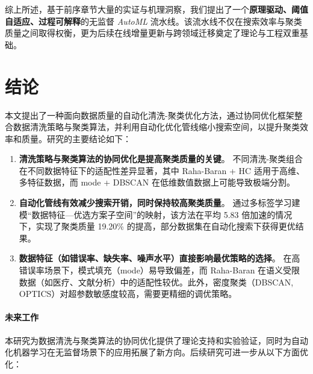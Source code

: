 \documentclass[10pt]{article} %
\numberwithin{equation}{section}
\begin{document}
\vspace{0.5em}
\noindent
\textcolor[rgb]{0.00,0.07,1.00}{综上所述，基于前序章节大量的实证与机理洞察，我们提出了一个\textbf{原理驱动、阈值自适应、过程可解释}的无监督 \textit{AutoML} 流水线。该流水线不仅在搜索效率与聚类质量之间取得权衡，更为后续在线增量更新与跨领域迁移奠定了理论与工程双重基础。}



\section{结论}
\label{sec:conclusion}

本文提出了一种面向数据质量的自动化清洗-聚类优化方法，通过协同优化框架整合数据清洗策略与聚类算法，并利用自动化优化管线缩小搜索空间，以提升聚类效率和质量。研究的主要结论如下：

\begin{enumerate}
    \item \textbf{清洗策略与聚类算法的协同优化是提高聚类质量的关键}。  
    不同清洗-聚类组合在不同数据特征下的适配性差异显著，其中 Raha-Baran + HC 适用于高维、多特征数据，而 mode + DBSCAN 在低维数值数据上可能导致极端分割。

    \item \textbf{自动化管线有效减少搜索开销，同时保持较高聚类质量}。  
    通过多标签学习建模“数据特征—优选方案子空间”的映射，该方法在平均 5.83 倍加速的情况下，实现了聚类质量 19.20\% 的提高，部分数据集在自动化搜索下获得更优结果。

    \item \textbf{数据特征（如错误率、缺失率、噪声水平）直接影响最优策略的选择}。  
    在高错误率场景下，模式填充（mode）易导致偏差，而 Raha-Baran 在语义受限数据（如医疗、文献分析）中的适配性较优。此外，密度聚类（DBSCAN, OPTICS）对超参数敏感度较高，需要更精细的调优策略。
\end{enumerate}

\paragraph{未来工作}  
本研究为数据清洗与聚类算法的协同优化提供了理论支持和实验验证，同时为自动化机器学习在无监督场景下的应用拓展了新方向。后续研究可进一步从以下方面优化：
\end{document}
